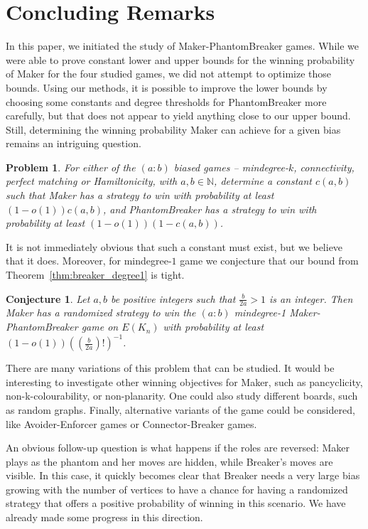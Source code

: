 \documentclass[11pt, a4paper]{article}
\numberwithin{equation}{section}
\numberwithin{figure}{section}
\newtheorem{conjecture}[theorem]{Conjecture}
\newtheorem{problem}[theorem]{Problem}
\begin{document}
\bigskip


\section{Concluding Remarks}
\label{sec:concluding}

In this paper, we initiated the study of Maker-PhantomBreaker games. While we were able to prove constant lower and upper bounds for the winning probability of Maker for the four studied games, we did not attempt to optimize those bounds. Using our methods, it is possible to improve the lower bounds by choosing some constants and degree thresholds for PhantomBreaker more carefully, but that does not appear to yield anything close to our upper bound. Still, determining the winning probability Maker can achieve for a given bias remains an intriguing question.
\begin{problem}
    For either of the $(a: b)$ biased games -- mindegree-$k$, connectivity, perfect matching or Hamiltonicity,
    with $a,b \in \mathbb{N}$, determine a constant $c(a,b)$ such that Maker has a strategy to win with probability at least $(1 - o(1))c(a,b)$, and PhantomBreaker has a strategy to win with probability at least $(1 - o(1))(1 - c(a,b))$.
\end{problem}
It is not immediately obvious that such a constant must exist, but we believe that it does. Moreover, for mindegree-$1$ game we conjecture that our bound from Theorem~\ref{thm:breaker_degree1} is tight.

\begin{conjecture}
Let $a,b$ be positive integers such that $\frac{b}{2a}>1$ is an integer. Then Maker has a randomized strategy to win the $(a:b)$ mindegree-1 Maker-PhantomBreaker game on $E(K_n)$ with probability at least $(1-o(1))\left( (\frac{b}{2a})!\right)^{-1}$.
\end{conjecture}

There are many variations of this problem that can be studied. It would be interesting to investigate other winning objectives for Maker, such as pancyclicity, non-k-colourability, or non-planarity. One could also study different boards, such as random graphs. Finally, alternative variants of the game could be considered, like Avoider-Enforcer games or Connector-Breaker games.

An obvious follow-up question is what happens if the roles are reversed: Maker plays as the phantom and her moves are hidden, while Breaker's moves are visible. In this case, it quickly becomes clear that Breaker needs a very large bias growing with the number of vertices to have a chance for having a randomized strategy that offers a positive probability of winning in this scenario. We have already made some progress in this direction.
\end{document}

